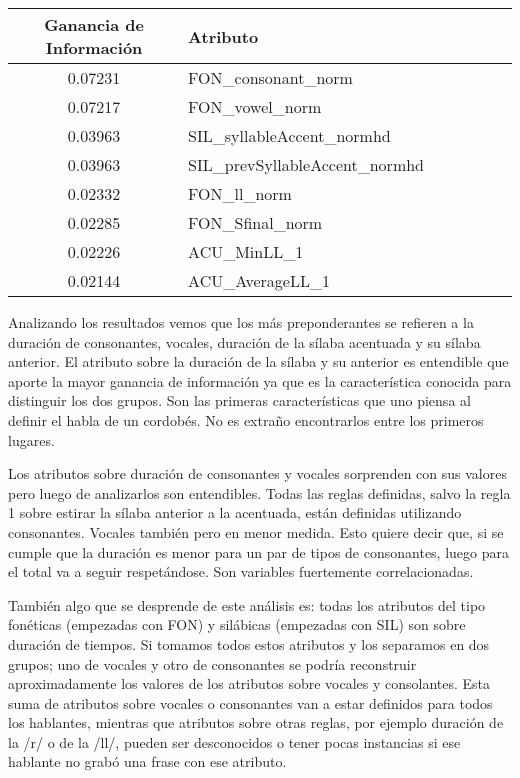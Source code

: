 \begin{table}[H]
\centering
\begin{tabular}{|c|l|c|c|c|c|c|}
\hline
\textbf{Ganancia de Información} & \textbf{Atributo} \\ \hline
 0.07231     & FON\_consonant\_norm \\ \hline
 0.07217     & FON\_vowel\_norm \\ \hline
 0.03963     & SIL\_syllableAccent\_normhd \\ \hline
 0.03963     & SIL\_prevSyllableAccent\_normhd \\ \hline
 0.02332     & FON\_ll\_norm \\ \hline
 0.02285     & FON\_Sfinal\_norm \\ \hline
 0.02226     & ACU\_MinLL\_1 \\ \hline
 0.02144     & ACU\_AverageLL\_1 \\ \hline
 
\end{tabular}
\end{table}

Analizando los resultados vemos que los más preponderantes se refieren a la duración de consonantes, vocales, duración de la sílaba acentuada y su sílaba anterior. El atributo sobre la duración de la sílaba y su anterior es entendible que aporte la mayor ganancia de información ya que es la característica conocida para distinguir los dos grupos. Son las primeras características que uno piensa al definir el habla de un cordobés. No es extraño encontrarlos entre los primeros lugares. 

Los atributos sobre duración de consonantes y vocales sorprenden con sus valores pero luego de analizarlos son entendibles. Todas las reglas definidas, salvo la regla 1 sobre estirar la sílaba anterior a la acentuada, están definidas utilizando consonantes. Vocales también pero en menor medida. Esto quiere decir que, si se cumple que la duración es menor para un par de tipos de consonantes, luego para el total va a seguir respetándose. Son variables fuertemente correlacionadas.

También algo que se desprende de este análisis es: todas los atributos del tipo fonéticas (empezadas con FON) y silábicas (empezadas con SIL) son sobre duración de tiempos. Si tomamos todos estos atributos y los separamos en dos grupos; uno de vocales y otro de consonantes se podría reconstruir aproximadamente los valores de los atributos sobre vocales y consolantes. Esta suma de atributos sobre vocales o consonantes van a estar definidos para todos los hablantes, mientras que atributos sobre otras reglas, por ejemplo duración de la /r/ o de la /ll/, pueden ser desconocidos o tener pocas instancias si ese hablante no grabó una frase con ese atributo. 


